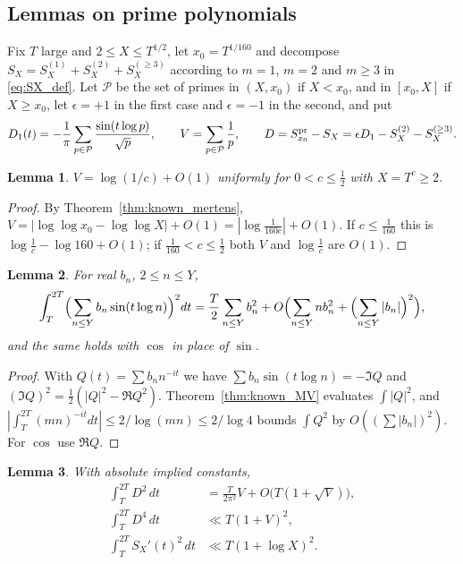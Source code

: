 \documentclass[11pt,reqno]{amsart}
\theoremstyle{plain}\newtheorem{theorem}{Theorem}[section]\newtheorem{proposition}[theorem]{Proposition}\newtheorem{lemma}[theorem]{Lemma}\newtheorem{corollary}[theorem]{Corollary}
\theoremstyle{definition}\newtheorem{hypothesis}[theorem]{Hypothesis}\newtheorem{definition}[theorem]{Definition}
\theoremstyle{remark}\newtheorem{remark}[theorem]{Remark}\newtheorem{experiment}[theorem]{Experiment}\newtheorem{question}[theorem]{Question}\newtheorem{heuristic}[theorem]{Heuristic}\newtheorem{conjecture}[theorem]{Conjecture}
\begin{document}
\subsection{Lemmas on prime polynomials}
\label{subsec:main_lemmas}

Fix $T$ large and $2\le X\le T^{1/2}$, let $x_0=T^{1/160}$ and decompose $S_X=S_X^{(1)}+S_X^{(2)}+S_X^{(\ge3)}$ according to $m=1$, $m=2$ and $m\ge3$ in \eqref{eq:SX_def}. Let $\mathcal P$ be the set of primes in $(X,x_0)$ if $X<x_0$, and in $[x_0,X]$ if $X\ge x_0$, let $\epsilon=+1$ in the first case and $\epsilon=-1$ in the second, and put
\begin{equation}
D_1(t)=-\frac1\pi\sum_{p\in\mathcal P}\frac{\sin(t\log p)}{\sqrt p},\qquad V=\sum_{p\in\mathcal P}\frac1p,\qquad D=S^{\rm pr}_{x_0}-S_X=\epsilon D_1-S_X^{(2)}-S_X^{(\ge3)} .
\label{eq:D_def}
\end{equation}

\begin{lemma}\label{lem:V_size}
$V=\log(1/c)+O(1)$ uniformly for $0<c\le\frac12$ with $X=T^c\ge2$.
\end{lemma}

\begin{proof}
By Theorem~\ref{thm:known_mertens}, $V=|\log\log x_0-\log\log X|+O(1)=|\log\frac{1}{160c}|+O(1)$. If $c\le\frac1{160}$ this is $\log\frac1c-\log160+O(1)$; if $\frac1{160}<c\le\frac12$ both $V$ and $\log\frac1c$ are $O(1)$.
\end{proof}

\begin{lemma}\label{lem:trig_MV}
For real $b_n$, $2\le n\le Y$,
\begin{equation}
\int_T^{2T}\Bigl(\sum_{n\le Y}b_n\sin(t\log n)\Bigr)^2dt=\frac T2\sum_{n\le Y}b_n^2+O\Bigl(\sum_{n\le Y}nb_n^2+\Bigl(\sum_{n\le Y}|b_n|\Bigr)^2\Bigr),
\label{eq:trig_MV}
\end{equation}
and the same holds with $\cos$ in place of $\sin$.
\end{lemma}

\begin{proof}
With $Q(t)=\sum b_nn^{-it}$ we have $\sum b_n\sin(t\log n)=-\Im Q$ and $(\Im Q)^2=\frac12(|Q|^2-\Re Q^2)$. Theorem~\ref{thm:known_MV} evaluates $\int|Q|^2$, and $|\int_T^{2T}(mn)^{-it}dt|\le2/\log(mn)\le2/\log4$ bounds $\int Q^2$ by $O((\sum|b_n|)^2)$. For $\cos$ use $\Re Q$.
\end{proof}

\begin{lemma}\label{lem:D_moments}
With absolute implied constants,
\begin{align}
\int_T^{2T}D^2\,dt&=\frac T{2\pi^2}V+O\bigl(T(1+\sqrt V)\bigr),
\label{eq:D_second}\\
\int_T^{2T}D^4\,dt&\ll T(1+V)^2,
\label{eq:D_fourth}\\
\int_T^{2T}S_X'(t)^2\,dt&\ll T(1+\log X)^2 .
\label{eq:SX_derivative}
\end{align}
\end{lemma}
\end{document}

